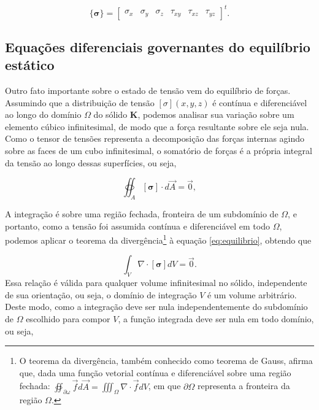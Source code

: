 \begin{equation}
    \{\bm{\sigma}\} = \begin{bmatrix}
        \sigma_x & \sigma_y & \sigma_z & \tau_{xy} & \tau_{xz} & \tau_{yz}
    \end{bmatrix}^t.
\end{equation}




\subsection{Equações diferenciais governantes do equilíbrio estático}

Outro fato importante sobre o estado de tensão vem do equilíbrio de forças. Assumindo que a distribuição de tensão $[\sigma](x,y,z)$ é contínua e diferenciável ao longo do domínio $\Omega$ do sólido $\bm{K}$, podemos analisar sua variação sobre um elemento cúbico infinitesimal, de modo que a força resultante sobre ele seja nula. Como o tensor de tensões representa a decomposição das forças internas agindo sobre as faces de um cubo infinitesimal, o somatório de forças é a própria integral da tensão ao longo dessas superfícies, ou seja,

\begin{equation}
    \oiint_A [\bm{\sigma}] \cdot d\vec{A} = \vec{0},
    \label{eq:equilibrio}
\end{equation}

A integração é sobre uma região fechada, fronteira de um subdomínio de $\Omega$, e portanto, como a tensão foi assumida contínua e diferenciável em todo $\Omega$, podemos aplicar o teorema da divergência\footnote{O teorema da divergência, também conhecido como teorema de Gauss, afirma que, dada uma função vetorial contínua e diferenciável sobre uma região fechada: $ \oiint_{\partial \omega} \vec{f} d\vec{A} = \iiint_{\Omega} \nabla \cdot \vec{f} dV$, em que $\partial \Omega$ representa a fronteira da região $\Omega$.} à equação \ref{eq:equilibrio}, obtendo que

\begin{equation}
    \int_V \nabla \cdot [\bm{\sigma}] dV = \vec{0}.
\end{equation}
Essa relação é válida para qualquer volume infinitesimal no sólido, independente de sua orientação, ou seja, o domínio de integração $V$ é um volume arbitrário. Deste modo, como a integração deve ser nula independentemente do subdomínio de $\Omega$ escolhido para compor $V$, a função integrada deve ser nula em todo domínio, ou seja,

